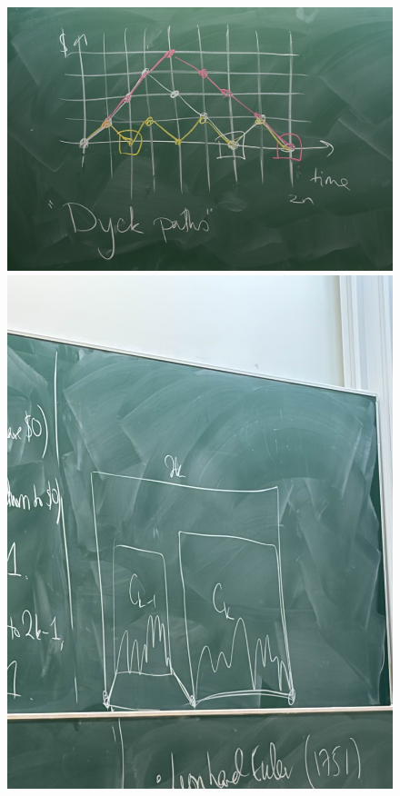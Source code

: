 \begin{answer}
    \begin{figure}[H]
    \centering
    \begin{minipage}[b]{0.45\textwidth} %
        \centering
        \includegraphics[width=\textwidth]{./Figures/IMG_0123.jpg}
    \end{minipage}
    \hfill %
    \begin{minipage}[b]{0.45\textwidth}
        \centering
        \includegraphics[width=\textwidth]{./Figures/IMG_0124.jpg}
    \end{minipage}
\end{figure}
\end{answer}

